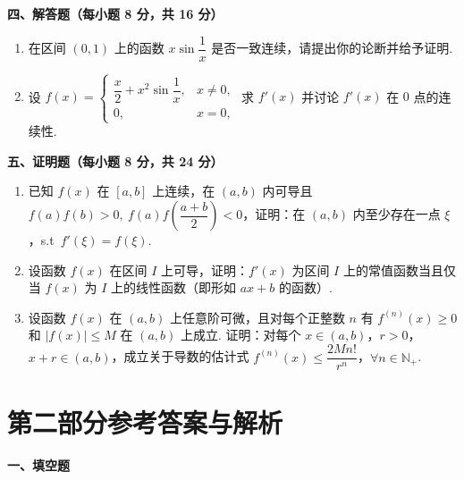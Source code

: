 \documentclass[a4paper,11pt]{ctexart}
\begin{document}
\vspace{0.8em}
\textbf{四、解答题（每小题 8 分，共 16 分）}

\begin{enumerate}[label=\arabic*., leftmargin=2em, itemsep=0.9em, topsep=0.5em]
  \item 在区间 $(0,1)$ 上的函数 $x\sin\dfrac{1}{x}$ 是否一致连续，请提出你的论断并给予证明.

  \item 设 $f(x)=\begin{cases} \dfrac{x}{2}+x^2\sin\dfrac{1}{x}, & x\neq 0, \\ 0, & x=0, \end{cases}$ 求 $f'(x)$ 并讨论 $f'(x)$ 在 $0$ 点的连续性.
\end{enumerate}

\vspace{0.8em}
\textbf{五、证明题（每小题 8 分，共 24 分）}

\begin{enumerate}[label=\arabic*., leftmargin=2em, itemsep=0.9em, topsep=0.5em]
  \item 已知 $f(x)$ 在 $[a,b]$ 上连续，在 $(a,b)$ 内可导且 $f(a)f(b)>0,\ f(a)f\!\left(\dfrac{a+b}{2}\right)<0$，证明：在 $(a,b)$ 内至少存在一点 $\xi$，s.t\ $f'(\xi)=f(\xi)$.

  \item 设函数 $f(x)$ 在区间 $I$ 上可导，证明：$f'(x)$ 为区间 $I$ 上的常值函数当且仅当 $f(x)$ 为 $I$ 上的线性函数（即形如 $ax+b$ 的函数）.

  \item 设函数 $f(x)$ 在 $(a,b)$ 上任意阶可微，且对每个正整数 $n$ 有 $f^{(n)}(x)\ge 0$ 和 $|f(x)|\le M$ 在 $(a,b)$ 上成立. 证明：对每个 $x\in(a,b)$，$r>0$，$x+r\in(a,b)$，成立关于导数的估计式 $f^{(n)}(x)\le\dfrac{2Mn!}{r^n}$，$\forall n\in \mathbb{N}_+$.
\end{enumerate}

\newpage
\section*{第二部分\quad 参考答案与解析}

\textbf{一、填空题}
\end{document}
